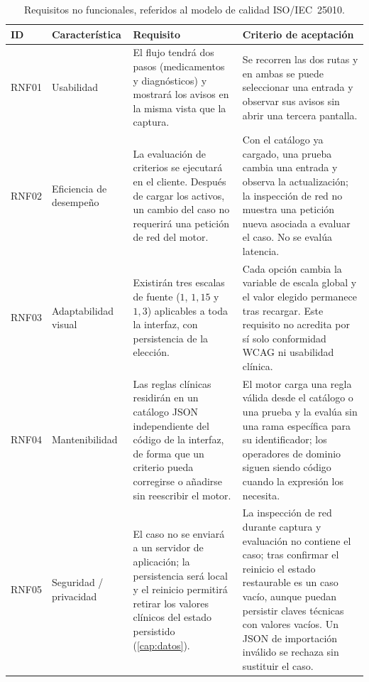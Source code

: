 \begin{table}[H]
  \centering
  \scriptsize
  \begin{tabularx}{\textwidth}{@{}l>{\raggedright\arraybackslash}p{2.3cm}XX@{}}
    \toprule
    \textbf{ID} & \textbf{Característica} & \textbf{Requisito} &
      \textbf{Criterio de aceptación} \\
    \midrule
    RNF01 & Usabilidad & El flujo tendrá dos pasos
      (medicamentos y diagnósticos) y mostrará los avisos en la misma
      vista que la captura. &
      Se recorren las dos rutas y en ambas se puede seleccionar una
      entrada y observar sus avisos sin abrir una tercera pantalla. \\
    RNF02 & Eficiencia de desempeño & La evaluación de criterios se
      ejecutará en el cliente. Después de cargar los activos, un cambio
      del caso no requerirá una petición de red del motor. &
      Con el catálogo ya cargado, una prueba cambia una entrada y
      observa la actualización; la inspección de red no muestra una
      petición nueva asociada a evaluar el caso. No se evalúa latencia. \\
    RNF03 & Adaptabilidad visual & Existirán tres escalas
      de fuente ($1$, $1{,}15$ y $1{,}3$) aplicables a toda la interfaz,
      con persistencia de la elección. &
      Cada opción cambia la variable de escala global y el valor elegido
      permanece tras recargar. Este requisito no acredita por sí solo
      conformidad WCAG ni usabilidad clínica. \\
    RNF04 & Mantenibilidad & Las reglas clínicas residirán en un catálogo
      JSON independiente del código de la interfaz, de forma que un
      criterio pueda corregirse o añadirse sin reescribir el motor. &
      El motor carga una regla válida desde el catálogo o una prueba y la
      evalúa sin una rama específica para su identificador; los operadores
      de dominio siguen siendo código cuando la expresión los necesita. \\
    RNF05 & Seguridad / privacidad & El caso no se enviará a un servidor
      de aplicación; la persistencia será local y el reinicio permitirá
      retirar los valores clínicos del estado persistido
      (\cref{cap:datos}). &
      La inspección de red durante captura y evaluación no contiene el
      caso; tras confirmar el reinicio el estado restaurable es un caso
      vacío, aunque puedan persistir claves técnicas con valores vacíos.
      Un JSON de importación inválido se rechaza sin sustituir el caso. \\
    \bottomrule
  \end{tabularx}
  \caption{Requisitos no funcionales, referidos al modelo de calidad
  ISO/IEC~25010.}
  \label{tab:rnf}
\end{table}

